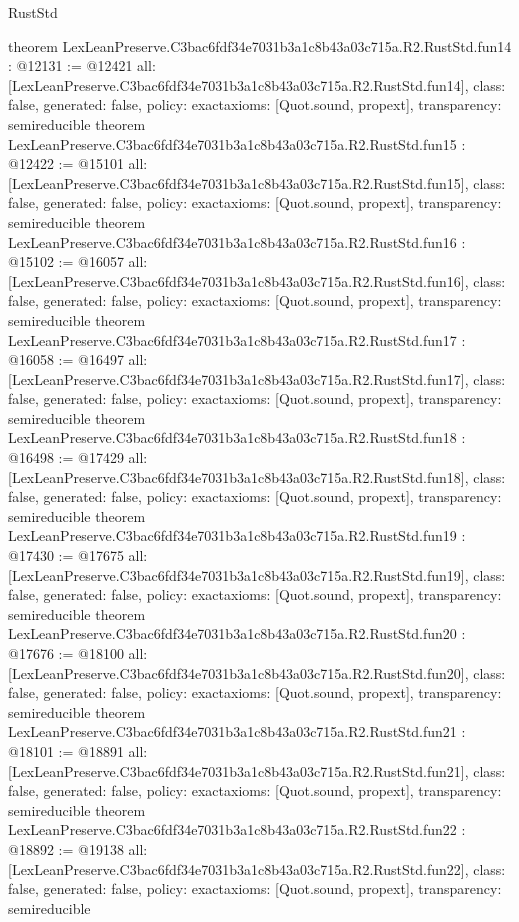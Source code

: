 \begin{lexlean}{RustStd}
\begin{coremodule}
{}
theorem LexLeanPreserve.C3bac6fdf34e7031b3a1c8b43a03c715a.R2.RustStd.fun14 : @12131 := @12421 {
  all: [LexLeanPreserve.C3bac6fdf34e7031b3a1c8b43a03c715a.R2.RustStd.fun14],
  class: false,
  generated: false,
  policy: exact{axioms: [Quot.sound, propext]},
  transparency: semireducible
}
theorem LexLeanPreserve.C3bac6fdf34e7031b3a1c8b43a03c715a.R2.RustStd.fun15 : @12422 := @15101 {
  all: [LexLeanPreserve.C3bac6fdf34e7031b3a1c8b43a03c715a.R2.RustStd.fun15],
  class: false,
  generated: false,
  policy: exact{axioms: [Quot.sound, propext]},
  transparency: semireducible
}
theorem LexLeanPreserve.C3bac6fdf34e7031b3a1c8b43a03c715a.R2.RustStd.fun16 : @15102 := @16057 {
  all: [LexLeanPreserve.C3bac6fdf34e7031b3a1c8b43a03c715a.R2.RustStd.fun16],
  class: false,
  generated: false,
  policy: exact{axioms: [Quot.sound, propext]},
  transparency: semireducible
}
theorem LexLeanPreserve.C3bac6fdf34e7031b3a1c8b43a03c715a.R2.RustStd.fun17 : @16058 := @16497 {
  all: [LexLeanPreserve.C3bac6fdf34e7031b3a1c8b43a03c715a.R2.RustStd.fun17],
  class: false,
  generated: false,
  policy: exact{axioms: [Quot.sound, propext]},
  transparency: semireducible
}
theorem LexLeanPreserve.C3bac6fdf34e7031b3a1c8b43a03c715a.R2.RustStd.fun18 : @16498 := @17429 {
  all: [LexLeanPreserve.C3bac6fdf34e7031b3a1c8b43a03c715a.R2.RustStd.fun18],
  class: false,
  generated: false,
  policy: exact{axioms: [Quot.sound, propext]},
  transparency: semireducible
}
theorem LexLeanPreserve.C3bac6fdf34e7031b3a1c8b43a03c715a.R2.RustStd.fun19 : @17430 := @17675 {
  all: [LexLeanPreserve.C3bac6fdf34e7031b3a1c8b43a03c715a.R2.RustStd.fun19],
  class: false,
  generated: false,
  policy: exact{axioms: [Quot.sound, propext]},
  transparency: semireducible
}
theorem LexLeanPreserve.C3bac6fdf34e7031b3a1c8b43a03c715a.R2.RustStd.fun20 : @17676 := @18100 {
  all: [LexLeanPreserve.C3bac6fdf34e7031b3a1c8b43a03c715a.R2.RustStd.fun20],
  class: false,
  generated: false,
  policy: exact{axioms: [Quot.sound, propext]},
  transparency: semireducible
}
theorem LexLeanPreserve.C3bac6fdf34e7031b3a1c8b43a03c715a.R2.RustStd.fun21 : @18101 := @18891 {
  all: [LexLeanPreserve.C3bac6fdf34e7031b3a1c8b43a03c715a.R2.RustStd.fun21],
  class: false,
  generated: false,
  policy: exact{axioms: [Quot.sound, propext]},
  transparency: semireducible
}
theorem LexLeanPreserve.C3bac6fdf34e7031b3a1c8b43a03c715a.R2.RustStd.fun22 : @18892 := @19138 {
  all: [LexLeanPreserve.C3bac6fdf34e7031b3a1c8b43a03c715a.R2.RustStd.fun22],
  class: false,
  generated: false,
  policy: exact{axioms: [Quot.sound, propext]},
  transparency: semireducible
}
\end{coremodule}
\end{lexlean}
